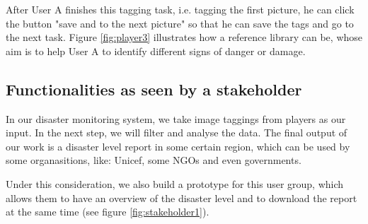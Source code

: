 After User A finishes this tagging task,
i.e.
tagging the first picture,
he can click the button "save and to the next picture" so that he can save the tags and go to the next task.
Figure \ref{fig:player3} illustrates how a reference library can be,
whose aim is to help User A to identify different signs of danger or damage.

\subsection{Functionalities as seen by a stakeholder}
In our disaster monitoring system, 
we take image taggings from players as our input. 
In the next step, 
we will filter and analyse the data.
The final output of our work is a disaster level report in some certain region,
which can be used by some organasitions,
like: Unicef, some NGOs and even governments.

Under this consideration, 
we also build a prototype for this user group,
which allows them to have an overview of the disaster level and to download the report at the same time (see figure \ref{fig:stakeholder1}).


